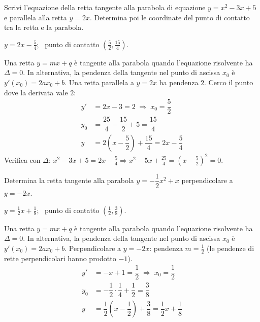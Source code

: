 \begin{question}[ID=3.3, subtitle={Tangente parallela a $y=2x$ alla parabola $y=x^2-3x+5$}, difficulty=media, tags={parabola, tangente}]
Scrivi l'equazione della retta tangente alla parabola di equazione $y = x^2 - 3x + 5$ e parallela alla retta $y = 2x$. Determina poi le coordinate del punto di contatto tra la retta e la parabola.
\begin{solution}
$y=2x-\tfrac54$; \ punto di contatto $\left(\tfrac52,\tfrac{15}{4}\right)$.
\end{solution}
\begin{explanation}
Una retta $y=mx+q$ è tangente alla parabola quando l'equazione risolvente ha $\Delta=0$. In alternativa, la pendenza della tangente nel punto di ascissa $x_0$ è $y'(x_0)=2ax_0+b$.
Una retta parallela a $y=2x$ ha pendenza $2$. Cerco il punto dove la derivata vale $2$:
\[\begin{aligned}
y' &= 2x-3=2 \;\Rightarrow\; x_0=\dfrac52\\
y_0 &= \dfrac{25}{4}-\dfrac{15}{2}+5=\dfrac{15}{4}\\
y &= 2\left(x-\dfrac52\right)+\dfrac{15}{4}=2x-\dfrac54
\end{aligned}\]
Verifica con $\Delta$: $x^2-3x+5=2x-\tfrac54 \Rightarrow x^2-5x+\tfrac{25}{4}=\left(x-\tfrac52\right)^2=0$.
\end{explanation}
\end{question}


\begin{question}[ID=3.4, subtitle={Tangente perpendicolare a $y=-2x$ alla parabola $y=-\frac12x^2+x$}, difficulty=media, tags={parabola, tangente}]
Determina la retta tangente alla parabola $y = -\dfrac{1}{2}x^2 + x$ perpendicolare a $y = -2x$.
\begin{solution}
$y=\tfrac12x+\tfrac18$; \ punto di contatto $\left(\tfrac12,\tfrac38\right)$.
\end{solution}
\begin{explanation}
Una retta $y=mx+q$ è tangente alla parabola quando l'equazione risolvente ha $\Delta=0$. In alternativa, la pendenza della tangente nel punto di ascissa $x_0$ è $y'(x_0)=2ax_0+b$.
Perpendicolare a $y=-2x$: pendenza $m=\tfrac12$ (le pendenze di rette perpendicolari hanno prodotto $-1$).
\[\begin{aligned}
y' &= -x+1=\dfrac12 \;\Rightarrow\; x_0=\dfrac12\\
y_0 &= -\dfrac12\cdot\dfrac14+\dfrac12=\dfrac38\\
y &= \dfrac12\left(x-\dfrac12\right)+\dfrac38=\dfrac12x+\dfrac18
\end{aligned}\]
\end{explanation}
\end{question}

